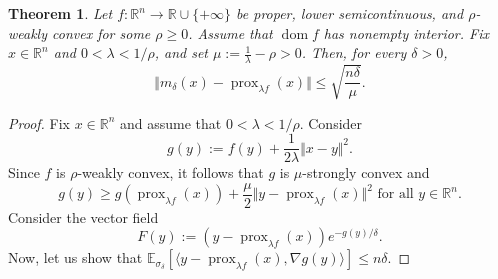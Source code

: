 \documentclass[11pt]{amsart}
\newcommand{\1}{\mathds{1}}
\newtheorem{theorem}{Theorem}[section]
\theoremstyle{definition}
\theoremstyle{remark}
\theoremstyle{definition}
\begin{document}
\begin{theorem}\label{convergence}
   Let $f\colon \mathbb{R}^n \to \mathbb{R}\cup \{+\infty\}$ be proper, lower semicontinuous,  and $\rho$-weakly convex for some $\rho\geq 0$.  Assume that $\operatorname{dom}f$ has nonempty interior. Fix $x\in \mathbb{R}^n$ and $0<\lambda <1/\rho$, and set $\mu:=\frac{1}{\lambda}-\rho>0$. 
Then, for every $\delta>0$,
$$
\Vert m_{\delta}(x)-\operatorname{prox}_{\lambda f}(x)\Vert \leq \sqrt{\frac{n\delta}{\mu}}.
$$
\end{theorem}
\begin{proof} 
Fix $x\in \mathbb{R}^n$ and assume that $0<\lambda <1/\rho$. Consider 
\begin{equation*}
g(y):=f(y)+\frac{1}{2\lambda}\Vert x-y\Vert^2.
\end{equation*}
Since $f$ is $\rho$-weakly convex, it follows that $g$ is $\mu$-strongly convex and
\begin{equation}\label{growth}
    g(y)\geq g(\operatorname{prox}_{\lambda f}(x))+\frac{\mu}{2}\Vert y-\operatorname{prox}_{\lambda f}(x)\Vert^2 \textrm{ for all } y\in \mathbb{R}^n.
\end{equation}
Consider the vector field
$$
F(y):=(y-\operatorname{prox}_{\lambda f}(x))e^{-g(y)/\delta}.
$$
Now, let us show that  $\mathbb{E}_{\sigma_{\delta}}\left[\langle y-\operatorname{prox}_{\lambda f}(x),\nabla g(y)\rangle \right]\leq n\delta$.
 

\end{proof}
\end{document}
